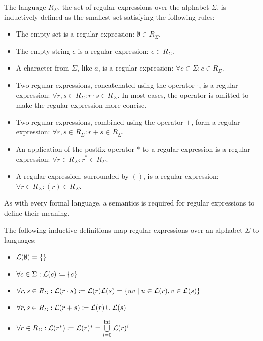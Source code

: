 \begin{definition}
    The language $R_\Sigma$, the set of regular expressions over the alphabet $\Sigma$,
    is inductively defined as the smallest set satisfying the following rules:

    \begin{itemize}
        \item The empty set is a regular expression:
        $\emptyset \in R_\Sigma$.
        \item The empty string $\epsilon$ is a regular expression:
        $\epsilon \in R_\Sigma$.
        \item A character from $\Sigma$, like $a$, is a regular expression:
        $\forall c \in \Sigma: c \in R_\Sigma$.
        \item Two regular expressions, concatenated using the operator $\cdot$, is a regular expression:
        $\forall r, s \in R_\Sigma: r \cdot s \in R_\Sigma$.
        In most cases, the operator is omitted to make the regular expression more concise.
        \item Two regular expressions, combined using the operator $+$, form a regular expression:
        $\forall r, s \in R_\Sigma: r + s \in R_\Sigma$.
        \item An application of the postfix operator $\ast$ to a regular expression is a regular expression:
        $\forall r \in R_\Sigma: r^\ast \in R_\Sigma$.
        \item A regular expression, surrounded by $()$, is a regular expression:
        $\forall r \in R_\Sigma: (r) \in R_\Sigma$.
    \end{itemize}
\end{definition}

As with every formal language, a semantics is required for regular expressions to define their meaning.

\begin{definition}
    The following inductive definitions map regular expressions over an alphabet $\Sigma$ to languages:

    \begin{itemize}
        \item $\mathcal{L}(\emptyset) = \{\}$
        \item $\forall c \in \Sigma: \mathcal{L}(c) \coloneqq \{c\} $
        \item $\forall r, s \in R_\Sigma: \mathcal{L}(r \cdot s) \coloneqq \mathcal{L}(r) \mathcal{L}(s) = \{ u v \mid u \in \mathcal{L}(r), v \in \mathcal{L}(s) \}$
        \item $\forall r, s \in R_\Sigma: \mathcal{L}(r + s) \coloneqq \mathcal{L}(r) \cup \mathcal{L}(s)$
        \item $\forall r \in R_\Sigma: \mathcal{L}(r^\ast) \coloneqq \mathcal{L}(r)^\ast = \bigcup\limits_{i=0}^{\inf} \mathcal{L}(r)^i$
    \end{itemize}
\end{definition}


